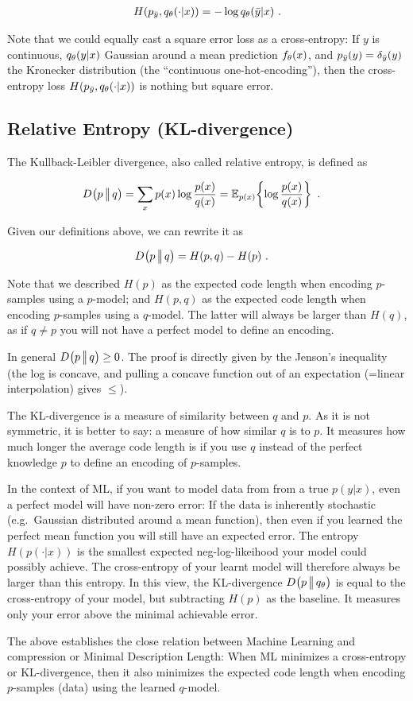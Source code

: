\begin{align}
H(p_{\bar y}, q_\t(\cdot|x)) = - \log q_\t(\bar y|x) ~.
\end{align}

Note that we could equally cast a square error loss as a cross-entropy: If $y$ is continuous, $q_\t(y|x)$ Gaussian around a mean prediction $f_\t(x)$, and $p_{\bar y}(y) = \d_{\bar y}(y)$ the Kronecker distribution (the ``continuous one-hot-encoding''), then the cross-entropy loss $H(p_{\bar y}, q_\t(\cdot|x))$ is nothing but square error.

\subsection{Relative Entropy (KL-divergence)}

The Kullback-Leibler divergence, also called relative entropy, is defined as

\begin{align}
\kld{p}{q}
&= \sum_x p(x) \log\frac{p(x)}{q(x)}
 = \Exp[p(x)]{\log\frac{p(x)}{q(x)}} ~.
\end{align}

Given our definitions above, we can rewrite it as

\begin{align}
\kld{p}{q}
&= H(p, q) - H(p) ~.
\end{align}

Note that we described $H(p)$ as the expected code length when encoding $p$-samples using a $p$-model; and $H(p, q)$ as the expected code length when encoding $p$-samples using a $q$-model. The latter will always be larger than $H(q)$, as if $q\not= p$ you will not have a perfect model to define an encoding.

In general $\kld{p}{q} \ge 0$. The proof is directly given by the Jenson's inequality (the log is concave, and pulling a concave function out of an expectation (=linear interpolation) gives $\le$).
 
The KL-divergence is a measure of similarity between $q$ and $p$. As it is not symmetric, it is better to say: a measure of how similar $q$ is to $p$. It measures how much longer the average code length is if you use $q$ instead of the perfect knowledge $p$ to define an encoding of $p$-samples.

In the context of ML, if you want to model data from from a true
$p(y|x)$, even a perfect model will have non-zero error: If the data
is inherently stochastic (e.g.\ Gaussian distributed around a mean
function), then even if you learned the perfect mean function you will
still have an expected error. The entropy $H(p(\cdot|x))$ is the
smallest expected neg-log-likeihood your model could possibly
achieve. The cross-entropy of your learnt model will therefore always
be larger than this entropy. In this view, the KL-divergence $\kld{p}{q_\t}$ is equal to the cross-entropy of your model, but subtracting $H(p)$ as the baseline. It measures only your error above the minimal achievable error.

The above establishes the close relation between Machine Learning and
compression or Minimal Description Length: When ML minimizes a
cross-entropy or KL-divergence, then it also minimizes the expected
code length when encoding $p$-samples (data) using the learned
$q$-model.


